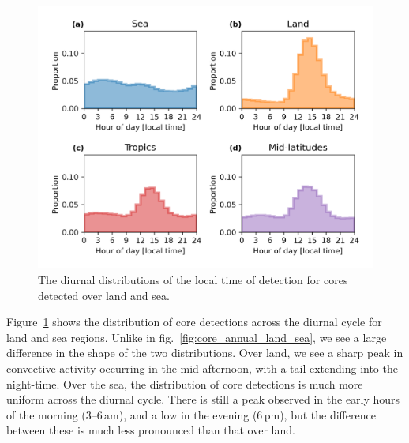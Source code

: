 \begin{figure}[tp]
    \centering
    \includegraphics[width=\textwidth]{figures/chapter2_12.png}
    \caption[
    The diurnal distributions of the local time of detection for cores detected over land and sea
    ]{
    The diurnal distributions of the local time of detection for cores detected over land and sea.
    }
    \label{fig:core_diurnal_land_sea}
\end{figure}

Figure~\ref{fig:core_diurnal_land_sea} shows the distribution of core detections across the diurnal cycle for land and sea regions.
Unlike in fig.~\ref{fig:core_annual_land_sea}, we see a large difference in the shape of the two distributions.
Over land, we see a sharp peak in convective activity occurring in the mid-afternoon, with a tail extending into the night-time.
Over the sea, the distribution of core detections is much more uniform across the diurnal cycle.
There is still a peak observed in the early hours of the morning (3--6\,am), and a low in the evening (6\,pm), but the difference between these is much less pronounced than that over land.

